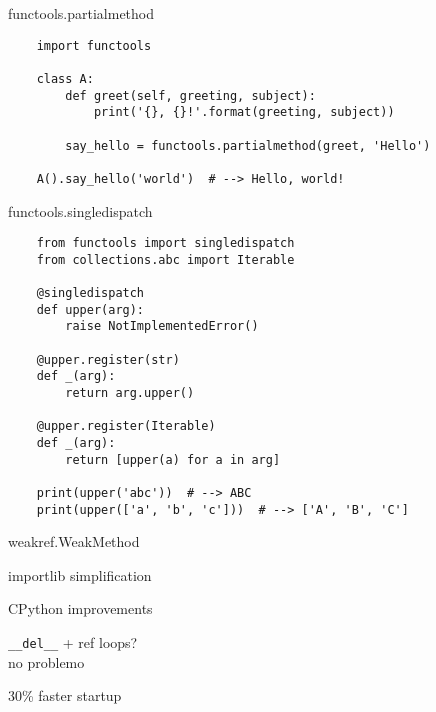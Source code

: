 \documentclass[20pt]{beamer}
\renewcommand\emph[1]{\textcolor{taskyblue}{#1}}
\begin{document}
\begin{center}
\begin{frame}[fragile]
    functools.\emph{partialmethod}
    \pause

    \bigskip

    \tiny
    \begin{verbatim}
    import functools

    class A:
        def greet(self, greeting, subject):
            print('{}, {}!'.format(greeting, subject))

        say_hello = functools.partialmethod(greet, 'Hello')

    A().say_hello('world')  # --> Hello, world!
    \end{verbatim}
\end{frame}

\begin{frame}[fragile]
    functools.\emph{singledispatch}
    \pause

    \tiny
    \begin{verbatim}
    from functools import singledispatch
    from collections.abc import Iterable

    @singledispatch
    def upper(arg):
        raise NotImplementedError()

    @upper.register(str)
    def _(arg):
        return arg.upper()

    @upper.register(Iterable)
    def _(arg):
        return [upper(a) for a in arg]

    print(upper('abc'))  # --> ABC
    print(upper(['a', 'b', 'c']))  # --> ['A', 'B', 'C']
    \end{verbatim}
\end{frame}

\begin{frame}[fragile]
    weakref.\emph{WeakMethod}
\end{frame}

\begin{frame}[fragile]
    \emph{importlib} simplification
\end{frame}

\begin{frame}[fragile]
    \emph{CPython} improvements

    \bigskip
    \pause

    \verb+__del__+ + ref loops? \\
    no problemo

    \bigskip
    \pause

     30\% faster startup
\end{frame}


\end{center}
\end{document}
